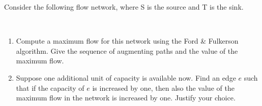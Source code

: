 Consider the following flow network, where  S is the source and T is the sink.

\begin{center} \leavevmode
    \bigskip

    \begin{figure}[h]
\mbox{}\end{figure}
 \\

    \bigskip
\end{center}

\begin{enumerate}
\item  Compute a maximum flow for this network using the Ford \&
    Fulkerson algorithm.  Give the sequence of augmenting paths and the
  value of the maximum flow.
\item  Suppose one additional unit of capacity is available now.  Find
  an edge $e$ such that if the capacity of $e$ is increased by one,
  then also the value of the maximum flow in the network is increased
  by one.  Justify your choice.
\end{enumerate}
